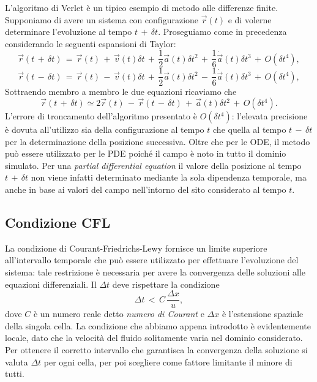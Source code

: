 L'algoritmo di Verlet è un tipico esempio di metodo alle differenze finite. Supponiamo di avere un sistema con configurazione $\Vec{r}(t)$ e di volerne determinare l'evoluzione al tempo $t\,+\,\delta t$. Proseguiamo come in precedenza considerando le seguenti espansioni di Taylor:
\begin{equation}
\Vec{r}(t\,+\,\delta t)\,=\,\Vec{r}(t)\,+\,\Vec{v}(t)\delta t\,+\,\frac{1}{2}\Vec{a}(t)\delta t^2\,+\,\frac{1}{6}\dot{\Vec{a}}(t)\delta t^3\,+\,O(\delta t^4),
\label{eq:exp1_verlet}
\end{equation}
\begin{equation}
\Vec{r}(t\,-\,\delta t)\,=\,\Vec{r}(t)\,-\,\Vec{v}(t)\delta t\,+\,\frac{1}{2}\Vec{a}(t)\delta t^2\,-\,\frac{1}{6}\dot{\Vec{a}}(t)\delta t^3\,+\,O(\delta t^4),
\label{eq:exp2_verlet}
\end{equation}
Sottraendo membro a membro le due equazioni ricaviamo che
\begin{equation}
\Vec{r}(t\,+\,\delta t) \simeq 2 \Vec{r}(t)\,-\,\Vec{r}(t\,-\,\delta t)\,+\,\Vec{a}(t)\delta t^2\,+\,O(\delta t^4).
\label{eq:pos_succ}
\end{equation}
L'errore di troncamento dell'algoritmo presentato è $O(\delta t^4)$: l'elevata precisione è dovuta all'utilizzo sia della configurazione al tempo $t$ che quella al tempo $t\,-\,\delta t$ per la determinazione della posizione successiva.
Oltre che per le ODE, il metodo può essere utilizzato per le PDE poiché il campo è noto in tutto il dominio simulato. 
Per una \textit{partial differential equation} il valore della posizione al tempo $t\,+\,\delta t$ non viene infatti determinato mediante la sola dipendenza temporale, ma anche in base ai valori del campo nell'intorno del sito considerato al tempo $t$.

\subsection{Condizione CFL} \label{subsec:cond_CFL}

La condizione di Courant-Friedrichs-Lewy fornisce un limite superiore all'intervallo temporale che può essere utilizzato per effettuare l'evoluzione del sistema: tale restrizione è necessaria per avere la convergenza delle soluzioni alle equazioni differenziali.
Il $\Delta t$ deve rispettare la condizione
\begin{equation}
\Delta t\,<\,C\,\frac{\Delta x}{u},
\label{eq:cond_deltaT}
\end{equation}
dove $C$ è un numero reale detto \textit{numero di Courant} e $\Delta x$ è l'estensione spaziale della singola cella. 
La condizione che abbiamo appena introdotto è evidentemente locale, dato che la velocità del fluido solitamente varia nel dominio considerato. Per ottenere il corretto intervallo che garantisca la convergenza della soluzione si valuta $\Delta t$ per ogni cella, per poi scegliere come fattore limitante il minore di tutti.


